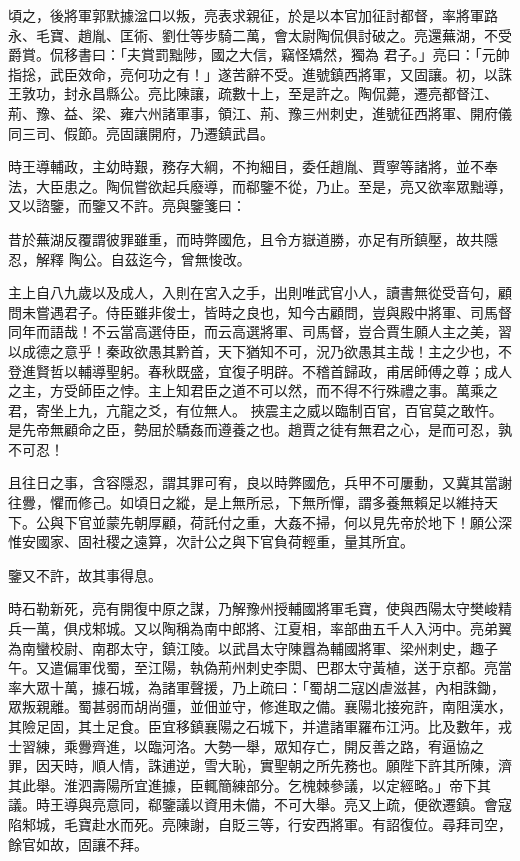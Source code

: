 \begin{pinyinscope}
 頃之，後將軍郭默據湓口以叛，亮表求親征，於是以本官加征討都督，率將軍路永、毛寶、趙胤、匡術、劉仕等步騎二萬，會太尉陶侃俱討破之。亮還蕪湖，不受爵賞。侃移書曰：「夫賞罰黜陟，國之大信，竊怪矯然，獨為
 君子。」亮曰：「元帥指捴，武臣效命，亮何功之有！」遂苦辭不受。進號鎮西將軍，又固讓。初，以誅王敦功，封永昌縣公。亮比陳讓，疏數十上，至是許之。陶侃薨，遷亮都督江、荊、豫、益、梁、雍六州諸軍事，領江、荊、豫三州刺史，進號征西將軍、開府儀同三司、假節。亮固讓開府，乃遷鎮武昌。



 時王導輔政，主幼時艱，務存大綱，不拘細目，委任趙胤、賈寧等諸將，並不奉法，大臣患之。陶侃嘗欲起兵廢導，而郗鑒不從，乃止。至是，亮又欲率眾黜導，又以諮鑒，而鑒又不許。亮與鑒箋曰：



 昔於蕪湖反覆謂彼罪雖重，而時弊國危，且令方嶽道勝，亦足有所鎮壓，故共隱忍，解釋
 陶公。自茲迄今，曾無悛改。



 主上自八九歲以及成人，入則在宮入之手，出則唯武官小人，讀書無從受音句，顧問未嘗遇君子。侍臣雖非俊士，皆時之良也，知今古顧問，豈與殿中將軍、司馬督同年而語哉！不云當高選侍臣，而云高選將軍、司馬督，豈合賈生願人主之美，習以成德之意乎！秦政欲愚其黔首，天下猶知不可，況乃欲愚其主哉！主之少也，不登進賢哲以輔導聖躬。春秋既盛，宜復子明辟。不稽首歸政，甫居師傅之尊；成人之主，方受師臣之悖。主上知君臣之道不可以然，而不得不行殊禮之事。萬乘之君，寄坐上九，亢龍之爻，有位無人。
 挾震主之威以臨制百官，百官莫之敢忤。是先帝無顧命之臣，勢屈於驕姦而遵養之也。趙賈之徒有無君之心，是而可忍，孰不可忍！



 且往日之事，含容隱忍，謂其罪可宥，良以時弊國危，兵甲不可屢動，又冀其當謝往釁，懼而修己。如頃日之縱，是上無所忌，下無所憚，謂多養無賴足以維持天下。公與下官並蒙先朝厚顧，荷託付之重，大姦不掃，何以見先帝於地下！願公深惟安國家、固社稷之遠算，次計公之與下官負荷輕重，量其所宜。



 鑒又不許，故其事得息。



 時石勒新死，亮有開復中原之謀，乃解豫州授輔國將軍毛寶，使與西陽太守樊峻精
 兵一萬，俱戍邾城。又以陶稱為南中郎將、江夏相，率部曲五千人入沔中。亮弟翼為南蠻校尉、南郡太守，鎮江陵。以武昌太守陳囂為輔國將軍、梁州刺史，趣子午。又遣偏軍伐蜀，至江陽，執偽荊州刺史李閎、巴郡太守黃植，送于京都。亮當率大眾十萬，據石城，為諸軍聲援，乃上疏曰：「蜀胡二寇凶虐滋甚，內相誅鋤，眾叛親離。蜀甚弱而胡尚彊，並佃並守，修進取之備。襄陽北接宛許，南阻漢水，其險足固，其土足食。臣宜移鎮襄陽之石城下，并遣諸軍羅布江沔。比及數年，戎士習練，乘釁齊進，以臨河洛。大勢一舉，眾知存亡，開反善之路，宥逼協之
 罪，因天時，順人情，誅逋逆，雪大恥，實聖朝之所先務也。願陛下許其所陳，濟其此舉。淮泗壽陽所宜進據，臣輒簡練部分。乞槐棘參議，以定經略。」帝下其議。時王導與亮意同，郗鑒議以資用未備，不可大舉。亮又上疏，便欲遷鎮。會寇陷邾城，毛寶赴水而死。亮陳謝，自貶三等，行安西將軍。有詔復位。尋拜司空，餘官如故，固讓不拜。




\end{pinyinscope}
